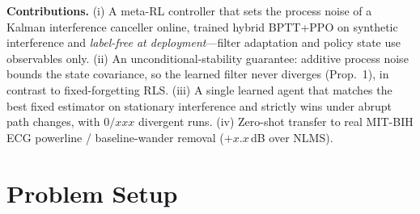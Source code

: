 \documentclass[journal]{IEEEtran}
\newcommand{\pend}[1]{\textcolor{pendingorange}{#1}}
\begin{document}
\smallskip\noindent\textbf{Contributions.}
(i) A meta-RL controller that sets the process noise of a Kalman interference
canceller online, trained hybrid BPTT+PPO on synthetic interference and
\emph{label-free at deployment}---filter adaptation and policy state use
observables only.
(ii) An unconditional-stability guarantee: additive process noise bounds the
state covariance, so the learned filter never diverges (Prop.~1), in contrast
to fixed-forgetting RLS.
(iii) A single learned agent that matches the best fixed estimator on
stationary interference and strictly wins under abrupt path changes, with
\pend{$0/xxx$} divergent runs.
(iv) Zero-shot transfer to real MIT-BIH ECG powerline / baseline-wander removal
(\pend{$+x.x$}\,dB over NLMS).

\section{Problem Setup}\label{sec:problem}
\end{document}
